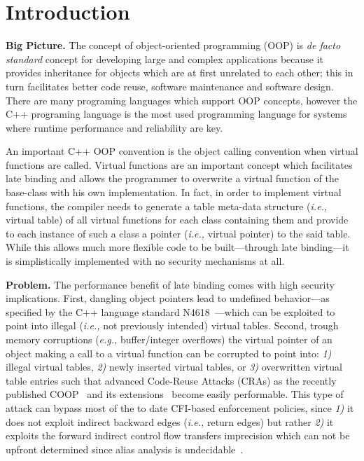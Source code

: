 \section{Introduction}
\label{chapter:Introduction}

\textbf{Big Picture.}
The concept of object-oriented programming (OOP) is \textit{de facto standard} concept for developing large and complex 
applications because it provides inheritance for objects which are at first unrelated to each other; this in turn 
facilitates better code reuse, software maintenance and software design. There are many programing languages
which support OOP concepts, however the C++ programing language is the most used programming language for systems where 
runtime performance and reliability are key.

An important C++ OOP convention is the object calling convention when virtual functions are called.
Virtual functions are an important concept which facilitates late binding and allows the programmer to overwrite a
virtual function of the base-class with his own implementation. In fact, in order to implement virtual functions, 
the compiler needs to generate a table meta-data structure (\textit{i.e.,} virtual table) of all
virtual functions for each class containing them and provide to each instance of such a class a pointer (\textit{i.e.,} virtual pointer)
to the said table. While this allows much more flexible code to be built---through late binding---it is simplistically implemented with no security
mechanisms at all.

\textbf{Problem.}
The performance benefit of late binding comes with high security implications. 
First, dangling object pointers lead to undefined behavior---as specified by the C++ language standard N4618~\cite{N4618}---which 
can be exploited to point into illegal (\textit{i.e.,} not previously intended) virtual tables.
Second, trough memory corruptions (\textit{e.g.,} buffer/integer overflows) the virtual pointer of an object making a 
call to a virtual function can be corrupted to point into:
\textit{1)} illegal virtual tables, 
\textit{2)} newly inserted virtual tables, or
\textit{3)} overwritten virtual table entries
such that advanced Code-Reuse Attacks (CRAs) as the recently published COOP~\cite{schuster:coop} 
and its extensions~\cite{crane:readactor++, crane:readactor++, subversive-c:lettner, ctf:coop, loop:oriented} 
become easily performable. This type of attack can bypass most of the to date CFI-based enforcement policies, since
\textit{1)} it does not exploit indirect backward edges (\textit{i.e.,} return edges) but rather
\textit{2)} it exploits the forward indirect control flow transfers imprecision which can not be upfront 
determined since alias analysis is undecidable~\cite{alias:undecidable}.

